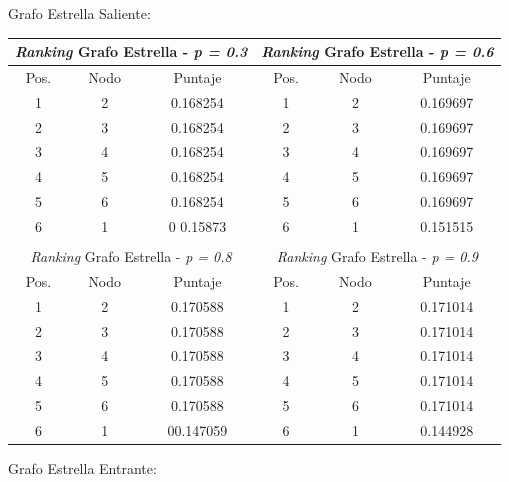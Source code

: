 Grafo Estrella Saliente:

\begin{center}
         \begin{tabular}{|c|c|c||c|c|c|}
                    \hline
                    \multicolumn{3}{|c||}{\emph{Ranking} Grafo Estrella - \emph{p = 0.3}} & \multicolumn{3}{c|}{\emph{Ranking} Grafo Estrella - \emph{p = 0.6}} \\ \hline
                    Pos. & Nodo & Puntaje    & Pos. & Nodo & Puntaje  \\ \hline
1 & 2 & 0.168254 & 1 & 2 & 0.169697 \\ 
2 & 3 & 0.168254 & 2 & 3 & 0.169697 \\
3 & 4 & 0.168254  & 3 & 4 & 0.169697 \\
4 & 5 & 0.168254  & 4 & 5 & 0.169697 \\
5 &  6 & 0.168254 & 5 & 6 &  0.169697 \\
6 & 1 & 0 0.15873 & 6 & 1 &  0.151515 \\ \hline
                    \multicolumn{6}{c}{} \\ \hline
                    \multicolumn{3}{|c||}{\emph{Ranking} Grafo Estrella - \emph{p = 0.8}} & \multicolumn{3}{c|}{\emph{Ranking} Grafo Estrella - \emph{p = 0.9}} \\ \hline
                    Pos. & Nodo & Puntaje    & Pos. & Nodo & Puntaje  \\ \hline
1 & 2 & 0.170588 & 1 & 2 & 0.171014 \\ 
2 & 3 & 0.170588 & 2 & 3 & 0.171014 \\
3 & 4 & 0.170588  & 3 & 4 & 0.171014 \\
4 & 5 & 0.170588  & 4 & 5 & 0.171014 \\
5 &  6 & 0.170588 & 5 & 6 &  0.171014 \\
6 & 1 & 00.147059 & 6 & 1 &  0.144928 \\ \hline

                \end{tabular}
            \end{center}
            
Grafo Estrella Entrante:

